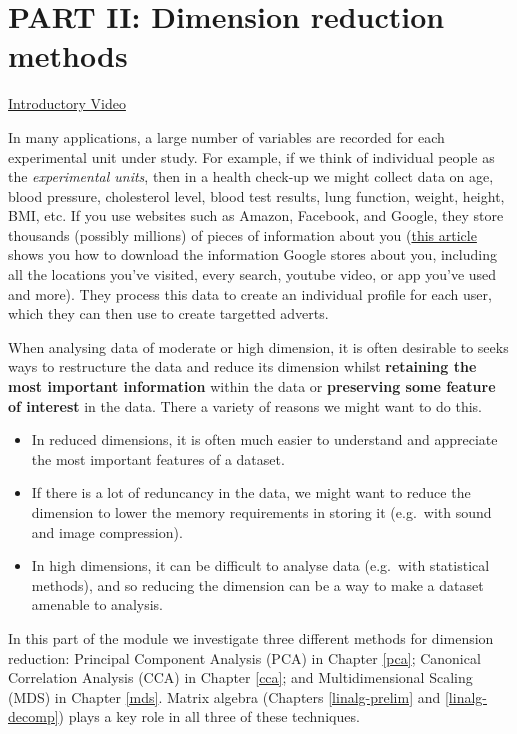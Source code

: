 \documentclass[
]{book}
\providecommand{\tightlist}{%
  \setlength{\itemsep}{0pt}\setlength{\parskip}{0pt}}
\theoremstyle{definition}
\theoremstyle{definition}
\theoremstyle{definition}
\theoremstyle{definition}
\theoremstyle{remark}
\begin{document}
\chapter*{PART II: Dimension reduction methods}\label{part-ii-dimension-reduction-methods}

\href{https://mediaspace.nottingham.ac.uk/media/Part+IIA+Dimension+reduction+introduction/1_0s2cgr1r}{Introductory Video}

In many applications, a large number of variables are recorded for each experimental unit under study. For example, if we think of individual people as the \emph{experimental units}, then in a health check-up we might collect data on age, blood pressure, cholesterol level, blood test results, lung function, weight, height, BMI, etc. If you use websites such as Amazon, Facebook, and Google, they store thousands (possibly millions) of pieces of information about you (\href{https://www.theguardian.com/commentisfree/2018/mar/28/all-the-data-facebook-google-has-on-you-privacy}{this article} shows you how to download the information Google stores about you, including all the locations you've visited, every search, youtube video, or app you've used and more). They process this data to create an individual profile for each user, which they can then use to create targetted adverts.

When analysing data of moderate or high dimension, it is often desirable to seeks ways to restructure the data and reduce its dimension whilst \textbf{retaining the most important information} within the data or \textbf{preserving some feature of interest} in the data. There a variety of reasons we might want to do this.

\begin{itemize}
\tightlist
\item
  In reduced dimensions, it is often much easier to understand and appreciate the most important features of a dataset.
\item
  If there is a lot of reduncancy in the data, we might want to reduce the dimension to lower the memory requirements in storing it (e.g.~with sound and image compression).
\item
  In high dimensions, it can be difficult to analyse data (e.g.~with statistical methods), and so reducing the dimension can be a way to make a dataset amenable to analysis.
\end{itemize}

In this part of the module we investigate three different methods for dimension reduction: Principal Component Analysis (PCA) in Chapter \ref{pca}; Canonical Correlation Analysis (CCA) in Chapter \ref{cca}; and Multidimensional Scaling (MDS) in Chapter \ref{mds}. Matrix algebra (Chapters \ref{linalg-prelim} and \ref{linalg-decomp}) plays a key role in all three of these techniques.
\end{document}
